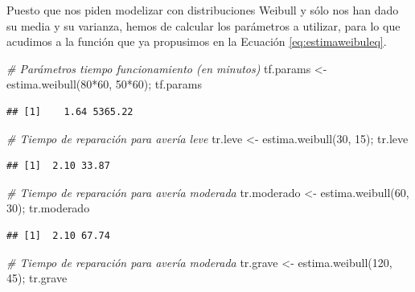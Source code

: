 \documentclass[
]{book}
\newenvironment{Shaded}{\begin{snugshade}}{\end{snugshade}}
\newcommand{\CommentTok}[1]{\textcolor[rgb]{0.56,0.35,0.01}{\textit{#1}}}
\newcommand{\DecValTok}[1]{\textcolor[rgb]{0.00,0.00,0.81}{#1}}
\newcommand{\FunctionTok}[1]{\textcolor[rgb]{0.00,0.00,0.00}{#1}}
\newcommand{\NormalTok}[1]{#1}
\newcommand{\OtherTok}[1]{\textcolor[rgb]{0.56,0.35,0.01}{#1}}
\newcommand{\SpecialCharTok}[1]{\textcolor[rgb]{0.00,0.00,0.00}{#1}}
\theoremstyle{definition}
\theoremstyle{definition}
\theoremstyle{definition}
\theoremstyle{definition}
\theoremstyle{remark}
\begin{document}
Puesto que nos piden modelizar con distribuciones Weibull y sólo nos han dado su media y su varianza, hemos de calcular los parámetros a utilizar, para lo que acudimos a la función que ya propusimos en la Ecuación \eqref{eq:estimaweibuleq}.

\begin{Shaded}
\begin{Highlighting}[]
\CommentTok{\# Parámetros tiempo funcionamiento (en minutos)}
\NormalTok{tf.params }\OtherTok{\textless{}{-}} \FunctionTok{estima.weibull}\NormalTok{(}\DecValTok{80}\SpecialCharTok{*}\DecValTok{60}\NormalTok{, }\DecValTok{50}\SpecialCharTok{*}\DecValTok{60}\NormalTok{); tf.params}
\end{Highlighting}
\end{Shaded}

\begin{verbatim}
## [1]    1.64 5365.22
\end{verbatim}

\begin{Shaded}
\begin{Highlighting}[]
\CommentTok{\# Tiempo de reparación para avería leve}
\NormalTok{tr.leve }\OtherTok{\textless{}{-}} \FunctionTok{estima.weibull}\NormalTok{(}\DecValTok{30}\NormalTok{, }\DecValTok{15}\NormalTok{); tr.leve}
\end{Highlighting}
\end{Shaded}

\begin{verbatim}
## [1]  2.10 33.87
\end{verbatim}

\begin{Shaded}
\begin{Highlighting}[]
\CommentTok{\# Tiempo de reparación para avería moderada}
\NormalTok{tr.moderado }\OtherTok{\textless{}{-}} \FunctionTok{estima.weibull}\NormalTok{(}\DecValTok{60}\NormalTok{, }\DecValTok{30}\NormalTok{); tr.moderado}
\end{Highlighting}
\end{Shaded}

\begin{verbatim}
## [1]  2.10 67.74
\end{verbatim}

\begin{Shaded}
\begin{Highlighting}[]
\CommentTok{\# Tiempo de reparación para avería moderada}
\NormalTok{tr.grave }\OtherTok{\textless{}{-}} \FunctionTok{estima.weibull}\NormalTok{(}\DecValTok{120}\NormalTok{, }\DecValTok{45}\NormalTok{); tr.grave}
\end{Highlighting}
\end{Shaded}
\end{document}

